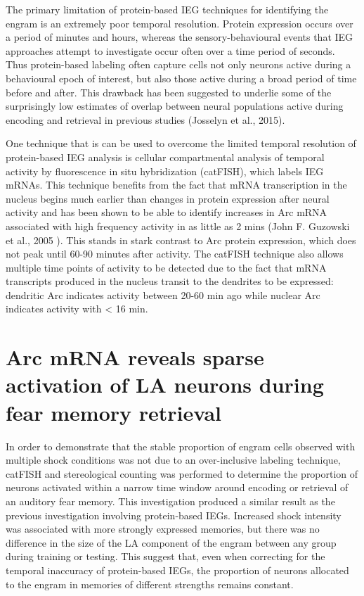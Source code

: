 \documentclass[12pt,a4paper,]{report}
\begin{document}
The primary limitation of protein-based IEG techniques for identifying
the engram is an extremely poor temporal resolution. Protein expression
occurs over a period of minutes and hours, whereas the
sensory-behavioural events that IEG approaches attempt to investigate
occur often over a time period of seconds. Thus protein-based labeling
often capture cells not only neurons active during a behavioural epoch
of interest, but also those active during a broad period of time before
and after. This drawback has been suggested to underlie some of the
surprisingly low estimates of overlap between neural populations active
during encoding and retrieval in previous studies (Josselyn et al.,
2015).

One technique that is can be used to overcome the limited temporal
resolution of protein-based IEG analysis is cellular compartmental
analysis of temporal activity by fluorescence in situ hybridization
(catFISH), which labels IEG mRNAs. This technique benefits from the fact
that mRNA transcription in the nucleus begins much earlier than changes
in protein expression after neural activity and has been shown to be
able to identify increases in Arc mRNA associated with high frequency
activity in as little as 2 mins (John F. Guzowski et al., 2005 ). This
stands in stark contrast to Arc protein expression, which does not peak
until 60-90 minutes after activity. The catFISH technique also allows
multiple time points of activity to be detected due to the fact that
mRNA transcripts produced in the nucleus transit to the dendrites to be
expressed: dendritic Arc indicates activity between 20-60 min ago while
nuclear Arc indicates activity with \textless{} 16 min.

\section{Arc mRNA reveals sparse activation of LA neurons during fear
memory
retrieval}\label{arc-mrna-reveals-sparse-activation-of-la-neurons-during-fear-memory-retrieval}

In order to demonstrate that the stable proportion of engram cells
observed with multiple shock conditions was not due to an over-inclusive
labeling technique, catFISH and stereological counting was performed to
determine the proportion of neurons activated within a narrow time
window around encoding or retrieval of an auditory fear memory. This
investigation produced a similar result as the previous investigation
involving protein-based IEGs. Increased shock intensity was associated
with more strongly expressed memories, but there was no difference in
the size of the LA component of the engram between any group during
training or testing. This suggest that, even when correcting for the
temporal inaccuracy of protein-based IEGs, the proportion of neurons
allocated to the engram in memories of different strengths remains
constant.
\end{document}
